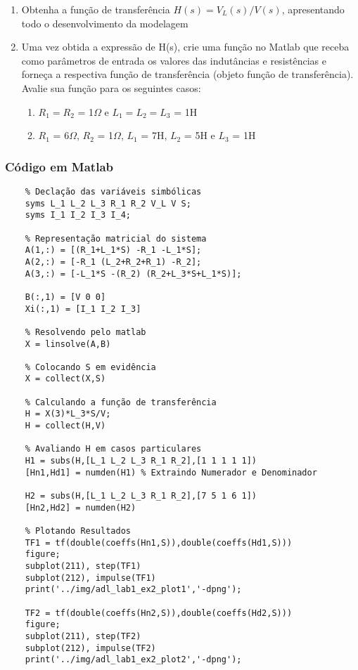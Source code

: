 \documentclass[a4paper,12pt]{article}
\begin{document}

\begin{enumerate}
    \item Obtenha a função de transferência $H(s) =V_{L}(s)/V(s)$, apresentando todo o desenvolvimento da modelagem
    \item Uma vez obtida a expressão de H(s), crie uma função no Matlab que receba como parâmetros de entrada os valores das indutâncias e resistências e forneça a respectiva função de transferência (objeto função de transferência). Avalie sua função para os seguintes casos:
    \begin{enumerate}
        \item  $R_{1} = R_{2}$ = 1$\Omega$ e $L_{1} = L_{2} = L_{3}$ = 1H
        \item $R_{1}$ = 6$\Omega$, $R_{2}$ = 1$\Omega$, $L_{1}$ = 7H, $L_{2}$ = 5H e $L_{3}$ = 1H
    \end{enumerate}
\end{enumerate}

\subsubsection{Código em Matlab}

\begin{verbatim}
    % Declação das variáveis simbólicas
    syms L_1 L_2 L_3 R_1 R_2 V_L V S;
    syms I_1 I_2 I_3 I_4;
    
    % Representação matricial do sistema
    A(1,:) = [(R_1+L_1*S) -R_1 -L_1*S];
    A(2,:) = [-R_1 (L_2+R_2+R_1) -R_2];
    A(3,:) = [-L_1*S -(R_2) (R_2+L_3*S+L_1*S)];
    
    B(:,1) = [V 0 0]
    Xi(:,1) = [I_1 I_2 I_3]
    
    % Resolvendo pelo matlab
    X = linsolve(A,B)
    
    % Colocando S em evidência
    X = collect(X,S)
    
    % Calculando a função de transferência
    H = X(3)*L_3*S/V;
    H = collect(H,V)
    
    % Avaliando H em casos particulares
    H1 = subs(H,[L_1 L_2 L_3 R_1 R_2],[1 1 1 1 1])
    [Hn1,Hd1] = numden(H1) % Extraindo Numerador e Denominador
    
    H2 = subs(H,[L_1 L_2 L_3 R_1 R_2],[7 5 1 6 1])
    [Hn2,Hd2] = numden(H2)

    % Plotando Resultados
    TF1 = tf(double(coeffs(Hn1,S)),double(coeffs(Hd1,S)))
    figure;
    subplot(211), step(TF1)
    subplot(212), impulse(TF1)
    print('../img/adl_lab1_ex2_plot1','-dpng');
        
    TF2 = tf(double(coeffs(Hn2,S)),double(coeffs(Hd2,S)))
    figure;
    subplot(211), step(TF2)
    subplot(212), impulse(TF2)
    print('../img/adl_lab1_ex2_plot2','-dpng');
\end{verbatim}
\end{document}
